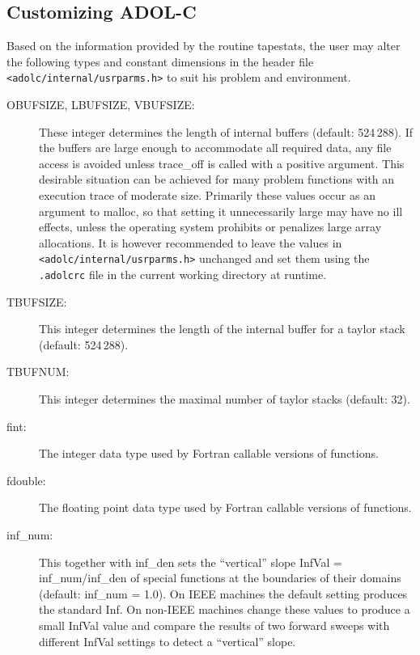 \documentclass[11pt,twoside]{article}
\begin{document}
\subsection{Customizing ADOL-C}
\label{Customizing}
%
Based on the information provided by the routine {\sf tapestats}, the user may alter the
following types and constant dimensions in the header file \verb=<adolc/internal/usrparms.h>=
to suit his problem and environment.

\begin{description}
\item[{\sf OBUFSIZE}, {\sf LBUFSIZE}, {\sf VBUFSIZE}{\rm :}] These integer determines the length of
in\-ter\-nal buf\-fers (default: 524$\,$288). If the buffers are large enough to accommodate all
required data, any file access is avoided unless {\sf trace\_off}
is called with a positive argument. This desirable situation can
be achieved for many problem functions with an execution trace of moderate
size. Primarily these values occur as an argument 
to {\sf malloc}, so that setting it unnecessarily large may have no
ill effects, unless the operating system prohibits or penalizes large
array allocations. It is however recommended to leave the values in
\texttt{<adolc/internal/usrparms.h>} unchanged and set them using the
\texttt{.adolcrc} file in the current working directory at runtime.

\item[{\sf TBUFSIZE}{\rm :}] This integer determines the length of the 
in\-ter\-nal buf\-fer for a taylor stack (default: 524$\,$288). 

\item[{\sf TBUFNUM}{\rm :}] This integer determines the maximal number of taylor stacks (default: 32).

\item[{\sf fint}{\rm :}] The integer data type used by Fortran callable versions of functions.

\item[{\sf fdouble}{\rm :}] The floating point data type used by Fortran callable versions of functions.

\item[{\sf inf\_num}{\rm :}] This together with {\sf inf\_den}
sets the ``vertical'' slope {\sf InfVal} = {\sf inf\_num/inf\_den}  
of special functions at the boundaries of their domains (default: {\sf inf\_num} = 1.0). On IEEE machines 
the default setting produces the standard {\sf Inf}. On non-IEEE machines
change these values to produce a small {\sf InfVal} value and compare
the results of two forward sweeps with different {\sf InfVal} settings
to detect a ``vertical'' slope.


\end{description}
\end{document}
